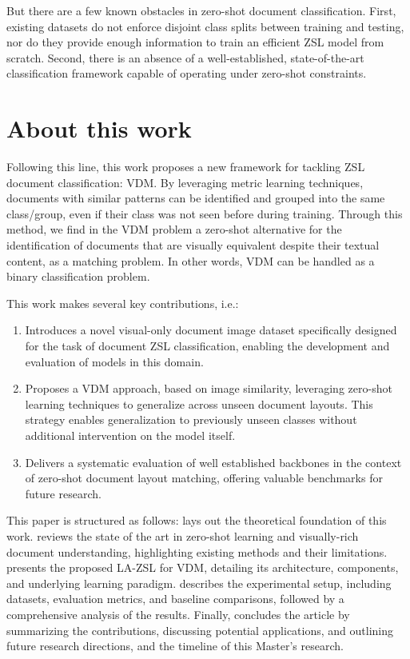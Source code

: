 But there are a few known obstacles in zero-shot document classification. First, existing datasets do not enforce disjoint class splits between training and testing, nor do they provide enough information to train an efficient \gls{ZSL} model from scratch. Second, there is an absence of a well-established, state-of-the-art classification framework capable of operating under zero-shot constraints.

\section{About this work}

Following this line, this work proposes a new framework for tackling \gls{ZSL} document classification: \gls{VDM}. By leveraging metric learning techniques, documents with similar patterns can be identified and grouped into the same class/group, even if their class was not seen before during training. Through this method, we find in the \gls{VDM} problem a zero-shot alternative for the identification of documents that are visually equivalent despite their textual content, as a matching problem. In other words, \gls{VDM} can be handled as a binary classification problem.

This work makes several key contributions, i.e.:
\begin{enumerate}
    \item Introduces a novel visual-only document image dataset specifically designed for the task of document ZSL classification, enabling the development and evaluation of models in this domain.
    \item Proposes a \gls{VDM} approach, based on image similarity, leveraging zero-shot learning techniques to generalize across unseen document layouts. This strategy enables generalization to previously unseen classes without additional intervention on the model itself.
    \item Delivers a systematic evaluation of well established backbones in the context of zero-shot document layout matching, offering valuable benchmarks for future research.
\end{enumerate}

This paper is structured as follows:  lays out the theoretical foundation of this work.  reviews the state of the art in zero-shot learning and visually-rich document understanding, highlighting existing methods and their limitations.  presents the proposed \gls{LA-ZSL} for \gls{VDM}, detailing its architecture, components, and underlying learning paradigm.  describes the experimental setup, including datasets, evaluation metrics, and baseline comparisons, followed by a comprehensive analysis of the results. Finally,  concludes the article by summarizing the contributions, discussing potential applications, and outlining future research directions, and the timeline of this Master's research.

